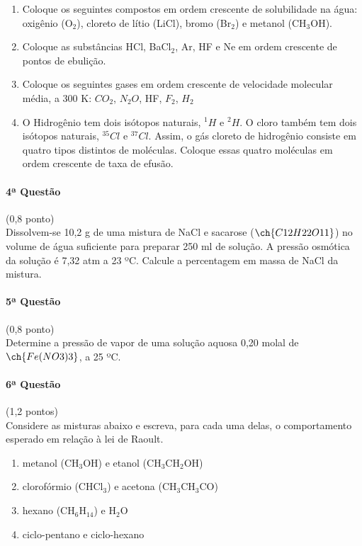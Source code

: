 \documentclass[12pt,a4paper]{article}
\begin{document}
\begin{enumerate}[label=\roman*.]
\item Coloque os seguintes compostos em ordem crescente de solubilidade na água: oxigênio (O$_2$), cloreto de lítio (LiCl), bromo (Br$_2$) e metanol (CH$_3$OH).
\item Coloque as substâncias HCl, BaCl$_2$, Ar, HF e Ne em ordem crescente de pontos de ebulição.
\item Coloque os seguintes gases em ordem crescente de velocidade molecular média, a $300$ K: $CO_2$, $N_2O$, HF, $F_2$, $H_2$
\item O Hidrogênio tem dois isótopos naturais, $^1H$ e $^2 H$. O cloro também tem dois isótopos naturais, $^{35} Cl$ e $^{37} Cl$. Assim, o gás cloreto de hidrogênio consiste em quatro tipos distintos de moléculas. Coloque essas quatro moléculas em ordem crescente de taxa de efusão.
\end{enumerate}

\paragraph{4ª Questão} (0,8 ponto)\\
Dissolvem-se 10,2 g de uma mistura de NaCl e sacarose ($\ch{C12H22O11}$) no volume de água suficiente para preparar 250 ml de solução. A pressão osmótica da solução é 7,32 atm a 23 ºC. Calcule a percentagem em massa de NaCl da mistura.

\paragraph{5ª Questão} (0,8 ponto)\\
Determine a pressão de vapor de uma solução aquosa 0,20 molal de $\ch{Fe(NO3)3}$, a 25 ºC.

\paragraph{6ª Questão} (1,2 pontos)\\
Considere as misturas abaixo e escreva, para cada uma delas, o comportamento esperado em relação à lei de Raoult. 

\begin{enumerate}[label=\roman*.]

\item metanol (CH$_3$OH) e etanol (CH$_3$CH$_2$OH)

\item clorofórmio (CHCl$_3$) e acetona (CH$_3$CH$_3$CO)

\item hexano (CH$_6$H$_{14}$) e H$_2$O

\item ciclo-pentano e ciclo-hexano

\end{enumerate}
\end{document}
